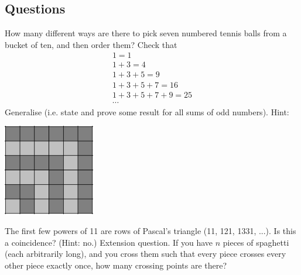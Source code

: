 \subsection*{Questions}
\begin{questions}
  \question How many different ways are there to pick seven numbered tennis balls from a bucket of ten, and then order them?
  \question Check that
            \begin{gather*}
              1 = 1\\
              1 + 3 = 4\\
              1 + 3 + 5 = 9\\
              1 + 3 + 5 + 7 = 16\\
              1 + 3 + 5 + 7 + 9 = 25\\
              \cdots
            \end{gather*}
            Generalise (i.e. state and prove some result for all sums of odd numbers). Hint:
            \begin{center}
              \includegraphics[width=0.3\textwidth]{sumodd}
            \end{center}
  \question The first few powers of 11 are rows of Pascal's triangle (11, 121, 1331, ...). Is this a coincidence? (Hint: no.)
  \question Extension question. If you have $ n $ pieces of spaghetti (each arbitrarily long), and you cross them such that
            every piece crosses every other piece exactly once, how many crossing points are there?
\end{questions}


